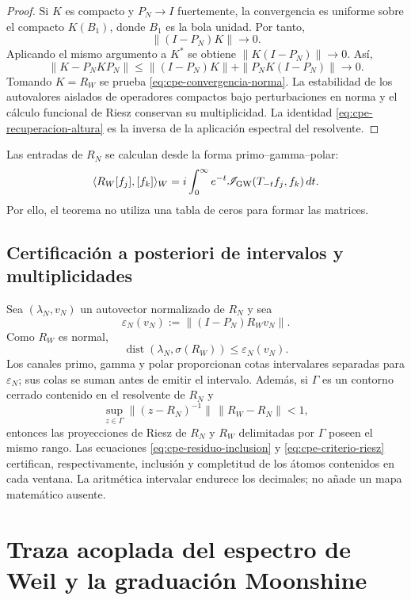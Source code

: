\begin{proof}
Si \(K\) es compacto y \(P_N\to I\) fuertemente, la convergencia es uniforme
sobre el compacto \(K(B_1)\), donde \(B_1\) es la bola unidad. Por tanto,
\[
 \|(I-P_N)K\|\longrightarrow0.
\]
Aplicando el mismo argumento a \(K^*\) se obtiene
\(\|K(I-P_N)\|\to0\). Así,
\[
 \|K-P_NKP_N\|
 \leq\|(I-P_N)K\|+\|P_NK(I-P_N)\|\longrightarrow0.
\]
Tomando \(K=R_W\) se prueba \eqref{eq:cpe-convergencia-norma}. La
estabilidad de los autovalores aislados de operadores compactos bajo
perturbaciones en norma y el cálculo funcional de Riesz conservan su
multiplicidad. La identidad \eqref{eq:cpe-recuperacion-altura} es la inversa
de la aplicación espectral del resolvente.
\end{proof}

Las entradas de \(R_N\) se calculan desde la forma primo--gamma--polar:
\[
 \langle R_W[f_j],[f_k]\rangle_W
 =i\int_0^\infty e^{-t}
 \mathscr I_{\rm GW}(T_{-t}f_j,f_k)\,dt.
\]
Por ello, el teorema no utiliza una tabla de ceros para formar las matrices.

\subsection{Certificación a posteriori de intervalos y multiplicidades}

Sea \((\lambda_N,v_N)\) un autovector normalizado de \(R_N\) y sea
\[
 \varepsilon_N(v_N)
 :=\|(I-P_N)R_Wv_N\|.
\]
Como \(R_W\) es normal,
\begin{equation}
 \operatorname{dist}(\lambda_N,\sigma(R_W))
 \leq\varepsilon_N(v_N).
 \label{eq:cpe-residuo-inclusion}
\end{equation}
Los canales primo, gamma y polar proporcionan cotas intervalares separadas
para \(\varepsilon_N\); sus colas se suman antes de emitir el intervalo.
Además, si \(\Gamma\) es un contorno cerrado contenido en el resolvente de
\(R_N\) y
\begin{equation}
 \sup_{z\in\Gamma}
 \|(z-R_N)^{-1}\|\,\|R_W-R_N\|<1,
 \label{eq:cpe-criterio-riesz}
\end{equation}
entonces las proyecciones de Riesz de \(R_N\) y \(R_W\) delimitadas por
\(\Gamma\) poseen el mismo rango. Las ecuaciones
\eqref{eq:cpe-residuo-inclusion} y \eqref{eq:cpe-criterio-riesz} certifican,
respectivamente, inclusión y completitud de los átomos contenidos en cada
ventana. La aritmética intervalar endurece los decimales; no añade un mapa
matemático ausente.

\section{Traza acoplada del espectro de Weil y la graduación Moonshine}
\label{sec:cpe-traza-rh-moonshine}

